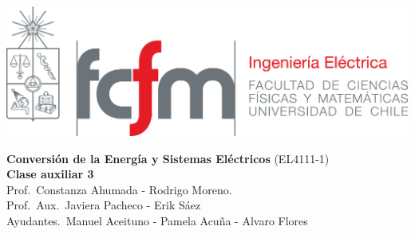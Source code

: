\documentclass[
  11pt,
  letterpaper,
   addpoints,
   answers
  ]{exam}
\begin{document}
\noindent
\begin{minipage}{0.47\textwidth}
\includegraphics[width=\textwidth]{../fcfm_die}
\end{minipage}
\begin{minipage}{0.53\textwidth}
\begin{center} 
\large\textbf{Conversión de la Energía y Sistemas Eléctricos } (EL4111-1) \\
\large\textbf{Clase auxiliar 3} \\
\small Prof.~Constanza Ahumada - Rodrigo Moreno.\\
\small Prof.~Aux.~Javiera Pacheco - Erik Sáez\\
\small Ayudantes.~Manuel Aceituno - Pamela Acuña - Alvaro Flores\\
\end{center}
\end{minipage}

\vspace{0.5cm}
\noindent
\vspace{.85cm}
\end{document}
